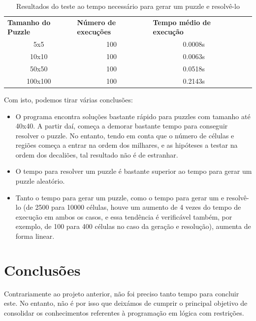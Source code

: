 \documentclass[runningheads,a4paper]{llncs}
\begin{document}
\begin{table}[]
\centering

\begin{tabular}{cccll}
\multicolumn{1}{l}{\textbf{Tamanho do Puzzle}} & \multicolumn{1}{l}{\textbf{Número de execuções}} & \multicolumn{1}{l}{\textbf{Tempo médio de execução}} &  &  \\
5x5                                            & 100                                              & 0.0008s                                              &  &  \\
10x10                                          & 100                                              & 0.0063s                                              &  &  \\
50x50                                          & 100                                              & 0.0518s                                              &  &  \\
100x100                                        & 100                                              & 0.2143s                                              &  & 
\end{tabular}
\caption{Resultados do teste ao tempo necessário para gerar um puzzle e resolvê-lo}
\end{table}

Com isto, podemos tirar várias conclusões:

\begin{itemize}
\item O programa encontra soluções bastante rápido para puzzles com tamanho até 40x40. A partir daí, começa a demorar bastante tempo para conseguir resolver o puzzle. No entanto, tendo em conta que o número de células e regiões começa a entrar na ordem dos milhares, e as hipóteses a testar na ordem dos decaliões, tal resultado não é de estranhar.
\item O tempo para resolver um puzzle é bastante superior ao tempo para gerar um puzzle aleatório.
\item Tanto o tempo para gerar um puzzle, como o tempo para gerar um e resolvê-lo (de 2500 para 10000 células, houve um aumento de 4 vezes do tempo de execução em ambos os casos, e essa tendência é verificável também, por exemplo, de 100 para 400 células no caso da geração e resolução), aumenta de forma linear.
\end{itemize}

\section{Conclusões}
Contrariamente ao projeto anterior, não foi preciso tanto tempo para concluir este. No entanto, não é por isso que deixámos de cumprir o principal objetivo de consolidar os conhecimentos referentes à programação em lógica com restrições.
\end{document}
